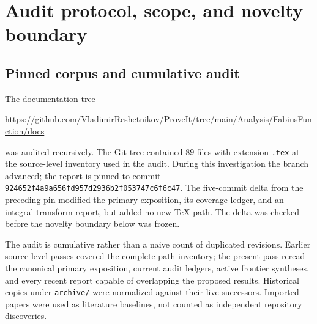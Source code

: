 \documentclass[11pt,oneside]{article}
\theoremstyle{definition}
\theoremstyle{remark}
\newcommand{\sinc}{\operatorname{sinc}}
\begin{document}
\begin{abstract}
Finally, the exact Haar detail energy $E_N$ is rational and has an all-orders
continuum expansion
\[
 E_N\sim \frac{h^2}{16}\|p'\|_2^2-
             \frac{h^4}{384}\|p''\|_2^2+
             \frac{h^6}{20480}\|p'''\|_2^2-\cdots,
 \qquad h=2^{-N}.
\]
The complete coefficient sequence is generated by $\sinc^4$, hence by complete
Bell polynomials in Bernoulli numbers.  The beyond-all-orders aliasing remainder
provides a new place where the known log-periodic Fourier decay should reappear.
The report distinguishes repository input, results proved here, numerical checks,
and conjectures; ``new'' always means new relative to the audited repository
corpus, not an assertion of worldwide priority.
\end{abstract}

\tableofcontents
\clearpage

\section{Audit protocol, scope, and novelty boundary}
\label{sec:audit}

\subsection{Pinned corpus and cumulative audit}

The documentation tree
\begin{center}
\url{https://github.com/VladimirReshetnikov/ProveIt/tree/main/Analysis/FabiusFunction/docs}
\end{center}
was audited recursively.  The Git tree contained $89$ files with extension
\texttt{.tex} at the source-level inventory used in the audit.  During this
investigation the branch advanced; the report is pinned to commit
\nolinkurl{924652f4a9a656fd957d2936b2f053747c6f6c47}.  The five-commit delta from
the preceding pin modified the primary exposition, its coverage ledger, and an
integral-transform report, but added no new TeX path.  The delta was checked
before the novelty boundary below was frozen.

The audit is cumulative rather than a naive count of duplicated revisions.
Earlier source-level passes covered the complete path inventory; the present
pass reread the canonical primary exposition, current audit ledgers, active
frontier syntheses, and every recent report capable of overlapping the proposed
results.  Historical copies under \texttt{archive/} were normalized against
their live successors.  Imported papers were used as literature baselines, not
counted as independent repository discoveries.
\end{document}
